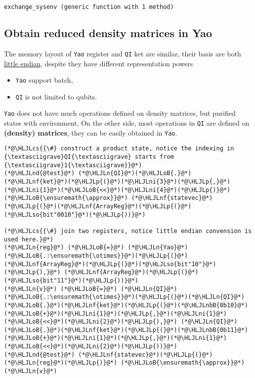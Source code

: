 \documentclass[11pt,a4paper]{article}
\newcommand{\HLJLn}[1]{#1}
\newcommand{\HLJLnd}[1]{\textcolor[RGB]{214,102,97}{#1}}
\newcommand{\HLJLnf}[1]{\textcolor[RGB]{66,102,213}{#1}}
\newcommand{\HLJLso}[1]{\textcolor[RGB]{201,61,57}{#1}}
\newcommand{\HLJLnbB}[1]{\textcolor[RGB]{59,151,46}{#1}}
\newcommand{\HLJLni}[1]{\textcolor[RGB]{59,151,46}{#1}}
\newcommand{\HLJLoB}[1]{\textcolor[RGB]{102,102,102}{\textbf{#1}}}
\newcommand{\HLJLp}[1]{#1}
\newcommand{\HLJLcs}[1]{\textcolor[RGB]{153,153,119}{\textit{#1}}}
\begin{document}
\begin{lstlisting}
exchange_sysenv (generic function with 1 method)
\end{lstlisting}


\subsection{Obtain reduced density matrices in Yao}
The memory layout of \texttt{Yao} register and \texttt{QI} ket are similar, their basis are both \href{https://en.wikipedia.org/wiki/Endianness}{little endian}, despite they have different representation powers

\begin{itemize}
\item \texttt{Yao} support batch,


\item \texttt{QI} is not limited to qubits.

\end{itemize}
\texttt{Yao} does not have much operations defined on density matrices, but purified states with environment, On the other side, most operations in \texttt{QI} are defined on \textbf{(density) matrices}, they can be easily obtained in \texttt{Yao}.


\begin{lstlisting}
(*@\HLJLcs{{\#} construct a product state, notice the indexing in {\textasciigrave}QI{\textasciigrave} starts from {\textasciigrave}1{\textasciigrave}}@*)
(*@\HLJLnd{@test}@*) (*@\HLJLn{QI}@*)(*@\HLJLoB{.}@*)(*@\HLJLnf{ket}@*)(*@\HLJLp{(}@*)(*@\HLJLni{3}@*)(*@\HLJLp{,}@*) (*@\HLJLni{1}@*)(*@\HLJLoB{<<}@*)(*@\HLJLni{4}@*)(*@\HLJLp{)}@*) (*@\HLJLoB{\ensuremath{\approx}}@*) (*@\HLJLnf{statevec}@*)(*@\HLJLp{(}@*)(*@\HLJLnf{ArrayReg}@*)(*@\HLJLp{(}@*)(*@\HLJLso{bit"0010"}@*)(*@\HLJLp{))}@*)

(*@\HLJLcs{{\#} join two registers, notice little endian convension is used here.}@*)
(*@\HLJLn{reg}@*) (*@\HLJLoB{=}@*) (*@\HLJLn{Yao}@*)(*@\HLJLoB{.:\ensuremath{\otimes}}@*)(*@\HLJLp{(}@*)(*@\HLJLnf{ArrayReg}@*)(*@\HLJLp{(}@*)(*@\HLJLso{bit"10"}@*)(*@\HLJLp{),}@*) (*@\HLJLnf{ArrayReg}@*)(*@\HLJLp{(}@*)(*@\HLJLso{bit"11"}@*)(*@\HLJLp{))}@*)
(*@\HLJLn{v}@*) (*@\HLJLoB{=}@*) (*@\HLJLn{QI}@*)(*@\HLJLoB{.:\ensuremath{\otimes}}@*)(*@\HLJLp{(}@*)(*@\HLJLn{QI}@*)(*@\HLJLoB{.}@*)(*@\HLJLnf{ket}@*)(*@\HLJLp{(}@*)(*@\HLJLnbB{0b10}@*)(*@\HLJLoB{+}@*)(*@\HLJLni{1}@*)(*@\HLJLp{,}@*)(*@\HLJLni{1}@*)(*@\HLJLoB{<<}@*)(*@\HLJLni{2}@*)(*@\HLJLp{),}@*) (*@\HLJLn{QI}@*)(*@\HLJLoB{.}@*)(*@\HLJLnf{ket}@*)(*@\HLJLp{(}@*)(*@\HLJLnbB{0b11}@*)(*@\HLJLoB{+}@*)(*@\HLJLni{1}@*)(*@\HLJLp{,}@*)(*@\HLJLni{1}@*)(*@\HLJLoB{<<}@*)(*@\HLJLni{2}@*)(*@\HLJLp{))}@*)
(*@\HLJLnd{@test}@*) (*@\HLJLnf{statevec}@*)(*@\HLJLp{(}@*)(*@\HLJLn{reg}@*)(*@\HLJLp{)}@*) (*@\HLJLoB{\ensuremath{\approx}}@*) (*@\HLJLn{v}@*)
\end{lstlisting}
\end{document}
